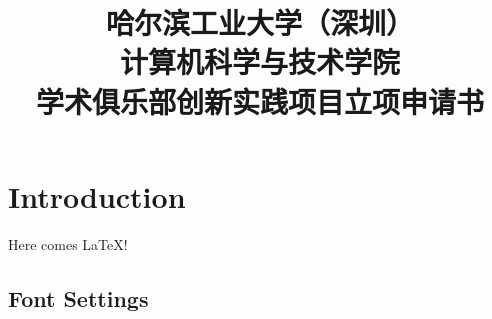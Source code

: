 \documentclass{article}
\title{
	\begin{adjustwidth}{-1cm}{-1cm}
	\Huge 
	\centering
	\heiti 
	\textbf{
		哈尔滨工业大学（深圳）
		\\计算机科学与技术学院
		\\学术俱乐部创新实践项目立项申请书  
		}
	\end{adjustwidth}	
}
\date{}
\begin{document}
\maketitle
\vspace*{2\baselineskip}
\section{Introduction}
Here comes \LaTeX!
\subsection{Font Settings}
\end{document}
